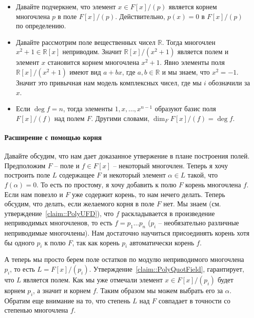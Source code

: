\begin{remarks}
\begin{itemize}
\item Давайте подчеркнем, что элемент $x\in F[x]/(p)$ является корнем многочлена $p$ в поле $F[x]/(p)$.
Действительно, $p(x) = 0$ в $F[x]/(p)$ по определению.

\item Давайте рассмотрим поле вещественных чисел $\mathbb R$.
Тогда многочлен $x^2 + 1\in \mathbb R[x]$ неприводим.
Значит $\mathbb R[x]/(x^2 +1)$ является полем и элемент $x$ становится корнем многочлена $x^2 + 1$.
Явно элементы поля $\mathbb R[x]/(x^2 + 1)$ имеют вид $a + bx$, где $a, b\in \mathbb R$ и мы знаем, что $x^2 = -1$.
Значит это привычная нам модель комплексных чисел, где мы $i$ обозначили за $x$.

\item Если $\deg f = n$, тогда элементы $1, x, \ldots, x^{n-1}$ образуют базис поля $F[x]/(f)$ над полем $F$.
Другими словами, $\dim_F F[x]/(f) = \deg f$.
\end{itemize}
\end{remarks}

\paragraph{Расширение с помощью корня}

Давайте обсудим, что нам дает доказанное утвержение в плане построения полей.
Предположим $F$ -- поле и $f\in F[x]$ -- некоторый многочлен.
Теперь я хочу построить поле $L$ содержащее $F$ и некоторый элемент $\alpha \in L$ такой, что $f(\alpha) = 0$.
То есть по простому, я хочу добавить к полю $F$ корень многочлена $f$.
Если нам повезло и $F$ уже содержит корень, то нам нечего делать.
Теперь обсудим, что делать, если желаемого корня в поле $F$ нет.
Мы знаем (см. утверждение~\ref{claim::PolyUFD}), что $f$ раскладывается в произведение неприводимых многочленов, то есть $f = p_1\ldots p_n$ ($p_i$ -- необязательно различные неприводимые многочлены).
Нам достаточно научиться присоединять корень хотя бы одного $p_i$ к полю $F$, так как корень $p_i$ автоматически корень $f$.

А теперь мы просто берем поле остатков по модулю неприводимого многочлена $p_i$, то есть $L = F[x]/(p_i)$.
Утверждение~\ref{claim::PolyQuotField}, гарантирует, что $L$ является полем.
Как мы уже отмечали элемент $x\in F[x]/(p_i)$ будет корнем $p_i$, а значит и корнем $f$.
Таким образом мы можем выбрать его за $\alpha$.
Обратим еще внимание на то, что степень $L$ над $F$ совпадает в точности со степенью многочлена $f$.


